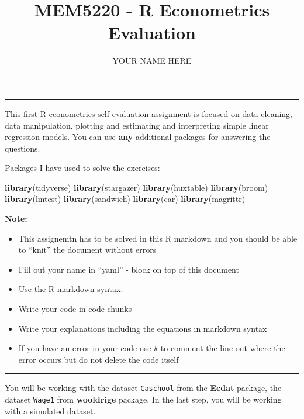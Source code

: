 \documentclass[12pt,]{article}
\title{MEM5220 - R Econometrics Evaluation}
\author{YOUR NAME HERE}
\date{}
\newenvironment{Shaded}{\begin{snugshade}}{\end{snugshade}}
\newcommand{\KeywordTok}[1]{\textcolor[rgb]{0.13,0.29,0.53}{\textbf{#1}}}
\newcommand{\NormalTok}[1]{#1}
\providecommand{\tightlist}{%
  \setlength{\itemsep}{0pt}\setlength{\parskip}{0pt}}
\begin{document}
\maketitle

\begin{center}\rule{0.5\linewidth}{\linethickness}\end{center}

This first R econometrics self-evaluation assignment is focused on data
cleaning, data manipulation, plotting and estimating and interpreting
simple linear regression models. You can use \textbf{any} additional
packages for answering the questions.

Packages I have used to solve the exercises:

\begin{Shaded}
\begin{Highlighting}[]
\KeywordTok{library}\NormalTok{(tidyverse)}
\KeywordTok{library}\NormalTok{(stargazer)}
\KeywordTok{library}\NormalTok{(huxtable)}
\KeywordTok{library}\NormalTok{(broom)}
\KeywordTok{library}\NormalTok{(lmtest)}
\KeywordTok{library}\NormalTok{(sandwich)}
\KeywordTok{library}\NormalTok{(car)}
\KeywordTok{library}\NormalTok{(magrittr)}
\end{Highlighting}
\end{Shaded}

\textbf{Note:}

\begin{itemize}
\tightlist
\item
  This assignemtn has to be solved in this R markdown and you should be
  able to ``knit'' the document without errors
\item
  Fill out your name in ``yaml'' - block on top of this document
\item
  Use the R markdown syntax:
\item
  Write your code in code chunks
\item
  Write your explanations including the equations in markdown syntax
\item
  If you have an error in your code use \texttt{\#} to comment the line
  out where the error occurs but do not delete the code itself
\end{itemize}

\begin{center}\rule{0.5\linewidth}{\linethickness}\end{center}

You will be working with the dataset \texttt{Caschool} from the
\textbf{Ecdat} package, the dataset \texttt{Wage1} from
\textbf{wooldrige} package. In the last step, you will be working with a
simulated dataset.
\end{document}
